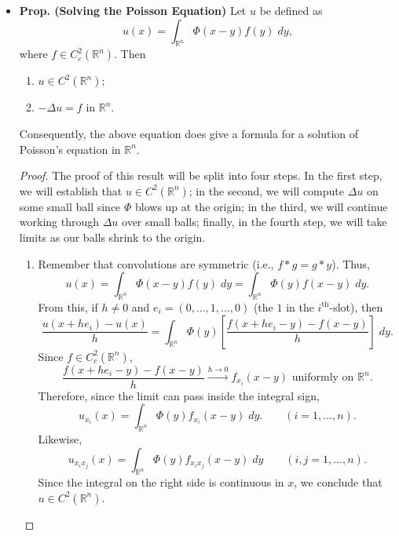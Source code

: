 \documentclass{article}
\begin{document}
\begin{itemize}
		\item \textbf{Prop. (Solving the Poisson Equation)} Let $u$ be defined as 
		\begin{equation*}
			u(x) = \int_{\mathbb{R}^{n}}\Phi(x-y)f(y)\;dy, 
		\end{equation*}
		where $f \in C_{c}^{2}(\mathbb{R}^{n})$. Then \vspace{-0.25cm}
		\begin{enumerate}[itemsep =-2pt,label= (\roman{*})]
			\item $u \in C^{2}(\mathbb{R}^{n})$; 
			\item $-\Delta u = f$ in $\mathbb{R}^{n}$. 
		\end{enumerate}
		Consequently, the above equation does give a formula for a solution of Poisson's equation in $\mathbb{R}^{n}$. 
		
		\begin{proof}
			The proof of this result will be split into four steps. In the first step, we will establish that $u \in C^{2}(\mathbb{R}^{n})$; in the second, we will compute $\Delta u$ on some small ball since $\Phi$ blows up at the origin; in the third, we will continue working through $\Delta u$ over small balls; finally, in the fourth step, we will take limits as our balls shrink to the origin. 
			
			\begin{enumerate}[itemsep=-2pt,label = (\arabic{*})]
				\item Remember that convolutions are symmetric (i.e., $f \ast g = g \ast y$). Thus, 
				\begin{equation*}
					u(x) = \int_{\mathbb{R}^{n}}\Phi(x-y)f(y)\;dy = \int_{\mathbb{R}^{n}}\Phi(y)f(x-y)\;dy. 
				\end{equation*}
				From this, if $h \neq 0$ and $e_{i} = (0,\ldots, 1, \ldots, 0)$ (the $1$ in the $i^{\text{th}}$-slot), then 
				\begin{equation*}
					\frac{u(x + he_{i}) - u(x)}{h} = \int_{\mathbb{R}^{n}}\Phi(y)\left[\frac{f(x + he_{i} - y) - f(x-y)}{h}\right]\;dy. 
				\end{equation*}
				Since $f \in C_{c}^{2}(\mathbb{R}^{n})$, 
				\begin{equation*}
					\frac{f(x + he_{i} - y) - f(x-y)}{h} \xrightarrow{h \to 0} f_{x_{i}}(x-y) \text{ uniformly on $\mathbb{R}^{n}$}. 
				\end{equation*}
				Therefore, since the limit can pass inside the integral sign, 
				\begin{equation*}
					u_{x_{i}}(x) = \int_{\mathbb{R}^{n}}\Phi(y)f_{x_{i}}(x-y)\;dy. \qquad (i = 1, \ldots, n). 
				\end{equation*}
				Likewise, 
				\begin{equation*}
					u_{x_{i}x_{j}}(x) = \int_{\mathbb{R}^{n}}\Phi(y)f_{x_{i}x_{j}}(x-y)\;dy \qquad (i, j = 1, \ldots, n). 
				\end{equation*}
				Since the integral on the right side is continuous in $x$, we conclude that $u \in C^{2}(\mathbb{R}^{n})$. 
				

\end{enumerate}
\end{proof}
\end{itemize}
\end{document}
